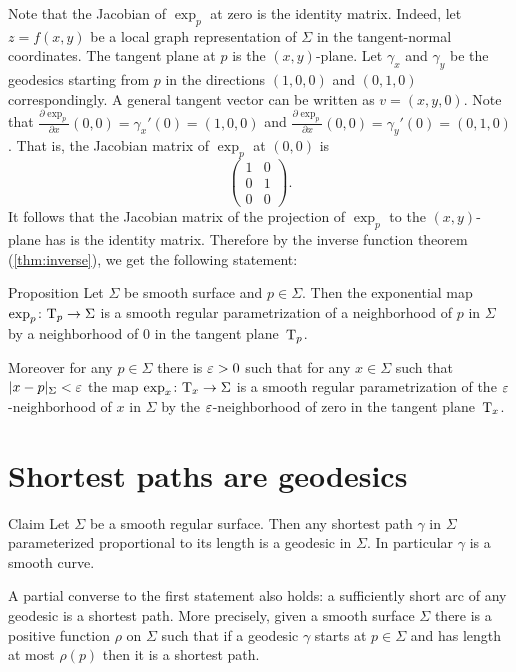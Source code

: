 Note that the Jacobian of $\exp_p$ at zero is the identity matrix.
Indeed, let $z=f(x,y)$ be a local graph representation of $\Sigma$ in the tangent-normal coordinates.
The tangent plane at $p$ is the $(x,y)$-plane.
Let $\gamma_x$ and $\gamma_y$ be the geodesics starting from $p$ in the directions
$(1,0,0)$
and
$(0,1,0)$
correspondingly.
A general tangent vector can be written as $v=(x,y,0)$.
Note that $\tfrac{\partial\exp_p}{\partial x}(0,0)=\gamma_x'(0)=(1,0,0)$ and  
$\tfrac{\partial\exp_p}{\partial x}(0,0)=\gamma_y'(0)=(0,1,0)$.
That is, the Jacobian matrix of $\exp_p$ at $(0,0)$ is
\[\begin{pmatrix}
1&0
\\
0&1
\\
0&0
  \end{pmatrix}.
\]
It follows that the Jacobian matrix of the projection of $\exp_p$ to the $(x,y)$-plane has is the identity matrix.
Therefore by the inverse function theorem (\ref{thm:inverse}), we get the following statement:

\begin{thm}{Proposition}\label{prop:exp}
Let $\Sigma$ be smooth surface and $p\in \Sigma$.
Then the exponential map $\exp_p\colon\mathrm{T}_p\to \Sigma$ is a smooth regular parametrization of a neighborhood of $p$ in $\Sigma$ by a neighborhood of $0$ in the tangent plane~$\mathrm{T}_p$.

Moreover for any $p\in \Sigma$ there is $\varepsilon>0$ such that for any $x\in \Sigma$ such that $|x-p|_\Sigma<\varepsilon$ the map 
$\exp_x\colon\mathrm{T}_x\to \Sigma$ is a smooth regular parametrization of the $\varepsilon$-neighborhood of $x$ in $\Sigma$ by the $\varepsilon$-neighborhood of zero in the tangent plane~$\mathrm{T}_x$. %
\end{thm}

\section*{Shortest paths are geodesics}


\begin{thm}{Claim}\label{clm:gamma''}
Let $\Sigma$ be a smooth regular surface.
Then any shortest path $\gamma$ in $\Sigma$ parameterized proportional to its length is a geodesic in $\Sigma$.
In particular $\gamma$ is a smooth curve.

A partial converse to the first statement also holds: a sufficiently short arc of any geodesic is a shortest path.
More precisely, given a smooth surface $\Sigma$ there is a positive function $\rho$ on $\Sigma$ such that 
if a geodesic $\gamma$ starts at $p\in \Sigma$ and has length at most $\rho(p)$ then it is a shortest path.
\end{thm}

